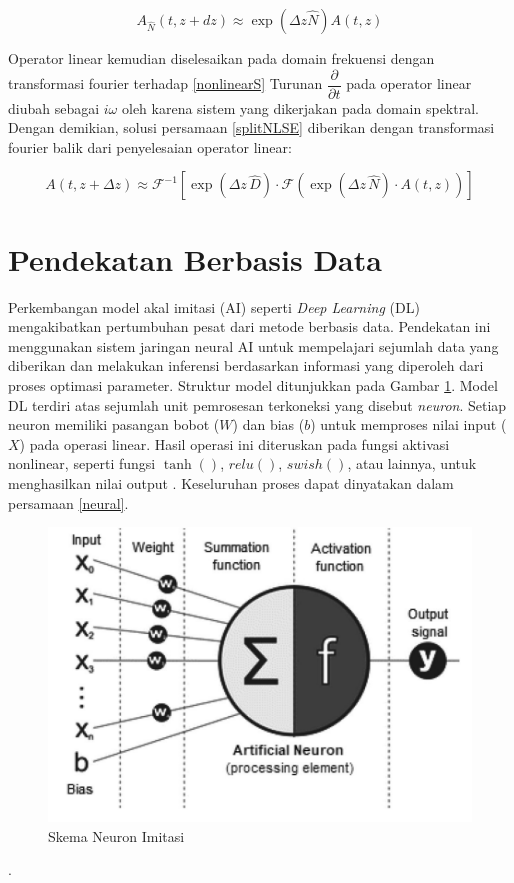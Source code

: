 \begin{equation}
    \label{nonlinearS}
    A_{\hat{N}}(t,z+dz) \approx \exp(\Delta z\hat{N})A(t,z)
\end{equation}

Operator linear kemudian diselesaikan pada domain frekuensi dengan  transformasi fourier terhadap \eqref{nonlinearS} Turunan \(\dfrac{\partial} {\partial t}\) pada operator linear diubah sebagai \(i\omega\) oleh karena sistem yang dikerjakan pada domain spektral. Dengan demikian, solusi persamaan \eqref{splitNLSE} diberikan dengan transformasi fourier balik dari penyelesaian operator linear:

\begin{equation}
    A(t, z + \Delta z) \approx \mathcal{F}^{-1} \left[ \exp\left( \Delta z \, \hat{D} \right) \cdot \mathcal{F} \left( \exp\left( \Delta z \, \hat{N} \right) \cdot A(t, z) \right) \right]
\end{equation}

\section{Pendekatan Berbasis Data}
Perkembangan model akal imitasi (AI) seperti \emph{Deep Learning} (DL) mengakibatkan pertumbuhan pesat dari metode berbasis data. Pendekatan ini menggunakan sistem jaringan neural AI untuk mempelajari sejumlah data yang diberikan dan melakukan inferensi berdasarkan informasi yang diperoleh dari proses optimasi parameter. Struktur model ditunjukkan  pada Gambar \ref{fig:neuron-scheme}. Model DL terdiri atas sejumlah unit pemrosesan terkoneksi yang disebut \emph{neuron}. Setiap neuron memiliki pasangan bobot (\(W\)) dan bias (\(b\)) untuk memproses nilai input (\(X\)) pada operasi linear. Hasil operasi ini diteruskan pada fungsi aktivasi nonlinear, seperti fungsi \(\tanh()\), \(relu()\), \(swish()\), atau lainnya, untuk menghasilkan nilai output . Keseluruhan proses dapat dinyatakan dalam persamaan \eqref{neural}.

\begin{figure}[htbp]
    \centering
    \includegraphics[scale=0.5]{Gambar/ArtificialNeuron.png}
    \caption{Skema Neuron Imitasi} 
    \label{fig:neuron-scheme}
\end{figure}.

